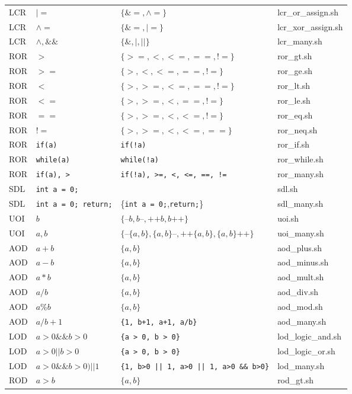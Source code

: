 \begin{longtable}{|p{1cm}|p{5cm}|p{6cm}|p{2.5cm}|}
LCR	&	$|=$	&	$\{\&=, \land=\}$	&	lcr\_or\_assign.sh \\
LCR	&	$\land=$	&	$\{\&=, |=\}$	&	lcr\_xor\_assign.sh \\
LCR	&	$\land, \&\&$	&	$\{\&,|,||\}$	&	lcr\_many.sh \\
ROR	&	$>$	&	$\{>=, <, <=, ==, !=\}$	&	ror\_gt.sh \\
ROR	&	$>=$	&	$\{>, <, <=, ==, !=\}$	&	ror\_ge.sh \\
ROR	&	$<$	&	$\{>, >=, <=, ==, !=\}$	&	ror\_lt.sh \\
ROR	&	$<=$	&	$\{>, >=, <, ==, !=\}$	&	ror\_le.sh \\
ROR	&	$==$	&	$\{>, >=, <, <=, !=\}$	&	ror\_eq.sh \\
ROR	&	$!=$	&	$\{>, >=, <, <=, ==\}$	&	ror\_neq.sh \\
ROR	&	\texttt{if(a)}	&	\texttt{if(!a)}	&	ror\_if.sh \\
ROR	&	\texttt{while(a)}	&	\texttt{while(!a)}	&	ror\_while.sh \\
ROR	&	\texttt{if(a), >}	&	\texttt{if(!a), >=, <, <=, ==, !=}	&	ror\_many.sh \\
SDL	&	\texttt{int a = 0;} &	\texttt{}	&	sdl.sh \\
SDL	&	\texttt{int a = 0; return;} &	\{\texttt{int a = 0;},\texttt{return;}\}	&	sdl\_many.sh \\
UOI	&	$b$	&	$\{\texttt{--}b, b\texttt{--}, \texttt{++}b, b\texttt{++}\}$	&	uoi.sh \\
UOI	&	$a,b$	&	$\{\texttt{--}\{a,b\}, \{a,b\}\texttt{--}, \texttt{++}\{a,b\}, \{a,b\}\texttt{++}\}$	&	uoi\_many.sh \\
AOD	&	$a + b$	&	$\{a, b\}$	&	aod\_plus.sh \\
AOD	&	$a - b$	&	$\{a, b\}$	&	aod\_minus.sh \\
AOD	&	$a * b$	&	$\{a, b\}$	&	aod\_mult.sh \\
AOD	&	$a / b$	&	$\{a, b\}$	&	aod\_div.sh \\
AOD	&	$a \% b$	&	$\{a, b\}$	&	aod\_mod.sh \\
AOD	&	$a / b + 1$	&	\texttt{\{1, b+1, a+1, a/b\}}	&	aod\_many.sh \\
LOD	&	$a > 0 \&\& b > 0$	&	\texttt{\{a > 0, b > 0\}}	&	lod\_logic\_and.sh \\
LOD	&	$a > 0 || b > 0$	&	\texttt{\{a > 0, b > 0\}}	&	lod\_logic\_or.sh \\
LOD	&	$a > 0 \&\& b > 0) || 1$	&	\texttt{\{1, b>0 || 1, a>0 || 1, a>0 \&\& b>0\}}	&	lod\_many.sh \\
ROD	&	$a>b$	&	$\{a, b\}$	&	rod\_gt.sh \\

\end{longtable}
